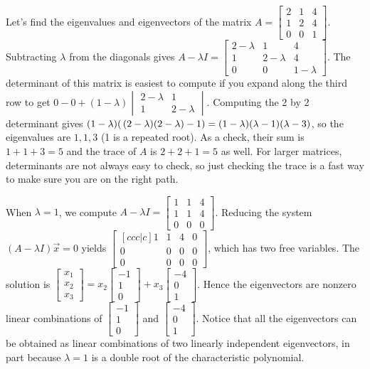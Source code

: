 \begin{example}\label{eigenvalueexample3} \label{ex eigen2}
Let's find the eigenvalues and eigenvectors of the matrix 
$A=\begin{bmatrix}2&1&4\\ 1&2&4\\ 0&0&1\end{bmatrix}$. 
Subtracting $\lambda$ from the diagonals gives 
$A-\lambda I=\begin{bmatrix}2-\lambda&1&4\\ 1&2-\lambda&4\\ 0&0&1-\lambda\end{bmatrix}$. The determinant of this matrix is easiest to compute if you expand along the third row to get $0 - 0 + (1-\lambda) \begin{vmatrix} 2-\lambda&1\\1&2-\lambda\end{vmatrix}$. Computing the 2 by 2 determinant gives $(1-\lambda)(\thinspace(2-\lambda)(2-\lambda)-1) = (1-\lambda)(\lambda-1)(\lambda-3)$,  so the eigenvalues are $1,1,3$ (1 is a repeated root). As a check, their sum is $1+1+3=5$ and the trace of $A$ is $2+2+1=5$ as well. For larger matrices, determinants are not always easy to check, so just checking the trace is a fast way to make sure you are on the right path.

When $\lambda=1$, we compute $A-\lambda I =\begin{bmatrix}1&1&4\\ 1&1&4\\ 0&0&0\end{bmatrix} $. Reducing the system  $(A-\lambda I )\vec x=0$ yields $\begin{bmatrix}[ccc|c]1&1&4&0\\ 0&0&0&0\\ 0&0&0&0\end{bmatrix}$, which has two free variables. The solution is $\begin{bmatrix} x_1\\x_2\\ x_3\end{bmatrix} = x_2\begin{bmatrix} -1\\1\\0\end{bmatrix}+x_3\begin{bmatrix} -4\\0\\1\end{bmatrix} $. Hence the eigenvectors are nonzero linear combinations of $\begin{bmatrix} -1\\1\\0\end{bmatrix}$ and $\begin{bmatrix} -4\\0\\1\end{bmatrix}$. Notice that all the eigenvectors can be obtained as linear combinations of two linearly independent eigenvectors, in part because $\lambda =1$ is a double root of the characteristic polynomial. 


\end{example}
